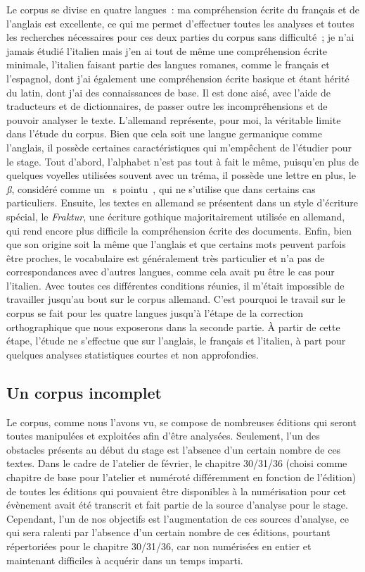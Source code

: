 Le corpus se divise en quatre langues~: ma compréhension écrite du français et de l'anglais est excellente, ce qui me permet d'effectuer toutes les analyses et toutes les recherches nécessaires pour ces deux parties du corpus sans difficulté~; je n'ai jamais étudié l'italien mais j'en ai tout de même une compréhension écrite minimale, l'italien faisant partie des langues romanes, comme le français et l'espagnol, dont j'ai également une compréhension écrite basique et étant hérité du latin, dont j'ai des connaissances de base. Il est donc aisé, avec l'aide de traducteurs et de dictionnaires, de passer outre les incompréhensions et de pouvoir analyser le texte. L'allemand représente, pour moi, la véritable limite dans l'étude du corpus. Bien que cela soit une langue germanique comme l'anglais, il possède certaines caractéristiques qui m'empêchent de l'étudier pour le stage. Tout d'abord, l'alphabet n'est pas tout à fait le même, puisqu'en plus de quelques voyelles utilisées souvent avec un tréma, il possède une lettre en plus, le \textit{ß}, considéré comme un \og~s pointu~\fg{}, qui ne s'utilise que dans certains cas particuliers. Ensuite, les textes en allemand se présentent dans un style d'écriture spécial, le \textit{Fraktur}, une écriture gothique majoritairement utilisée en allemand, qui rend encore plus difficile la compréhension écrite des documents. Enfin, bien que son origine soit la même que l'anglais et que certains mots peuvent parfois être proches, le vocabulaire est généralement très particulier et n'a pas de correspondances avec d'autres langues, comme cela avait pu être le cas pour l'italien. Avec toutes ces différentes conditions réunies, il m'était impossible de travailler jusqu'au bout sur le corpus allemand. C'est pourquoi le travail sur le corpus se fait pour les quatre langues jusqu'à l'étape de la correction orthographique que nous exposerons dans la seconde partie. À partir de cette étape, l'étude ne s'effectue que sur l'anglais, le français et l'italien, à part pour quelques analyses statistiques courtes et non approfondies.

\subsection{Un corpus incomplet}
Le corpus, comme nous l'avons vu, se compose de nombreuses éditions qui seront toutes manipulées et exploitées afin d'être analysées. Seulement, l'un des obstacles présents au début du stage est l'absence d'un certain nombre de ces textes. Dans le cadre de l'atelier de février, le chapitre 30/31/36 (choisi comme chapitre de base pour l'atelier et numéroté différemment en fonction de l'édition) de toutes les éditions qui pouvaient être disponibles à la numérisation pour cet évènement avait été transcrit et fait partie de la source d'analyse pour le stage. Cependant, l'un de nos objectifs est l'augmentation de ces sources d'analyse, ce qui sera ralenti par l'absence d'un certain nombre de ces éditions, pourtant répertoriées pour le chapitre 30/31/36, car non numérisées en entier et maintenant difficiles à acquérir dans un temps imparti.


